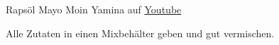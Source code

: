 \begin{recipe}[]{ Rapsöl Mayo }{ Moin Yamina auf \href{https://www.youtube.com/watch?v=I68KLKFsKpM}{Youtube} }{  }



\step
Alle Zutaten in einen Mixbehälter geben und gut vermischen.  



\end{recipe}